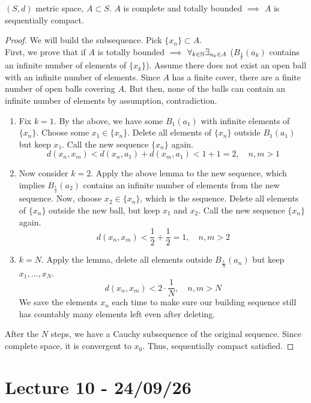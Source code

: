 \documentclass[11pt]{article}
\begin{document}
\begin{theorem}
    $(S, d)$ metric space, $A \subset S$. $A$ is complete and totally bounded $\implies$ $A$ is sequentially compact.
\end{theorem}
\begin{proof}
    We will build the subsequence. Pick $\{x_n\} \subset A$.\\
    First, we prove that if $A$ is totally bounded $\implies $ $\forall_{k \in \mathbb{N}} \exists_{a_k \in A}$ ($B_{\frac{1}{k}}(a_k)$ contains an infinite number of elements of $\{x_k\}$).
    Assume there does not exist an open ball with an infinite number of elements. Since $A$ has a finite cover, there are a finite number of open balls covering $A$. But then,
    none of the balls can contain an infinite number of elements by assumption, contradiction.\\
\begin{enumerate}
    \item Fix $k = 1$. By the above, we have some $B_{1}(a_1)$ with infinite elements of $\{x_n\}$. Choose some $x_1 \in \{x_n\}$. Delete all elements of $\{x_n\}$ outside
    $B_1(a_1)$ but keep $x_1$. Call the new sequence $\{x_n\}$ again.
    \[
        d(x_n, x_m) < d(x_n, a_1) + d(x_m, a_1) < 1+1 = 2, \quad n,m > 1
    \]
    \item Now consider $k = 2$. Apply the above lemma to the new sequence, which implies $B_{\frac{1}{2}}(a_2)$ contains an infinite number of elements from the new sequence. 
    Now, choose $x_2 \in \{x_n\}$, which is the sequence. Delete all elements of $\{x_n\}$ outside the new ball, but keep $x_1$ and $x_2$.
    Call the new sequence $\{x_n\}$ again.
    \[
        d(x_n, x_m) < \frac{1}{2} + \frac{1}{2} = 1, \quad n, m > 2
    \]
    \item[n.] $k = N$. Apply the lemma, delete all elements outside $B_{\frac{1}{N}}(a_n)$ but keep $x_1, \dots, x_N$.
    \[
        d(x_n, x_m) < 2 \cdot \frac{1}{N}, \quad n,m > N
    \]
   We save the elements $x_n$ each time to make sure our building sequence still has countably many elements left even after deleting.
\end{enumerate}
After the $N$ steps, we have a Cauchy subsequence of the original sequence. Since complete space, it is convergent to $x_0$. Thus, sequentially compact satisfied.
\end{proof}

\section{Lecture 10 - 24/09/26}
\end{document}
